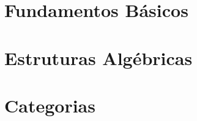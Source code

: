 \documentclass[10pt, a4paper]{book}
\begin{document}
\frontmatter




\tableofcontents

\mainmatter

\part{Fundamentos Básicos}





\part{Estruturas Algébricas}


\part{Categorias}

{}	%
\end{document}
